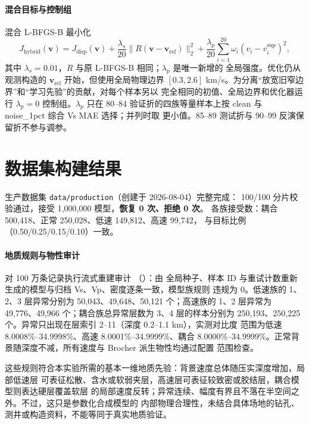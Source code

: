 \documentclass[UTF8,a4paper,11pt]{ctexart}
\begin{document}
\paragraph{混合目标与控制组}
混合 L-BFGS-B 最小化
\begin{equation}
J_{\mathrm{hybrid}}(\mathbf v)=J_{\mathrm{disp}}(\mathbf v)
+\frac{\lambda_s}{20}\|R(\mathbf v-\mathbf v_{\mathrm{ref}})\|_2^2
+\frac{\lambda_p}{20}\sum_{i=1}^{20}
\omega_i(v_i-v_i^{\mathrm{sup}})^2,
\end{equation}
其中 \(\lambda_s=0.01\)，\(R\) 与原 L-BFGS-B 相同；\(\lambda_p\) 是唯一新增的
全局强度。优化仍从观测构造的 \(\mathbf v_{\mathrm{ref}}\) 开始，但使用全局物理边界
\([0.3,2.6]\) km/s。为分离``放宽旧窄边界''和``学习先验''的贡献，对每个样本另以
完全相同的初值、全局边界和优化器运行 \(\lambda_p=0\) 控制组。\(\lambda_p\) 只在
80--84 验证折的四族等量样本上按 clean 与 noise\_1pct 综合 Vs MAE 选择；并列时取
更小值。85--89 测试折与 90--99 反演保留折不参与调参。

\section{数据集构建结果}\label{sec:data}
生产数据集 \texttt{data/production}（创建于 2026-08-04）完整完成：
100/100 分片校验通过，接受 1{,}000{,}000 模型，\textbf{恢复 0 次、拒绝 0 次}。
各族接受数：耦合 500{,}418、正常 250{,}028、低速 149{,}812、高速 99{,}742，
与目标比例（0.50/0.25/0.15/0.10）一致。

\paragraph{地质规则与物性审计}
对 100 万条记录执行流式重建审计
（）：由
全局种子、样本 ID 与重试计数重新生成的模型与归档 Vs、Vp、密度逐条一致，模型族规则
违规为 0。低速族的 1、2、3 层异常分别为 50{,}043、49{,}648、50{,}121 个；高速族的
1、2 层异常为 49{,}776、49{,}966 个；耦合族总异常层数为 3、4 层的样本分别为
250{,}193、250{,}225 个。异常只出现在层索引 2--11（深度 0.2--1.1 km），实测对比度
范围为低速 8.0008\%--34.9998\%、高速 8.0001\%--34.9999\%、耦合
8.0000\%--34.9999\%。正常背景随深度不减，所有速度与 Brocher 派生物性均通过配置
范围检查。

这些规则符合本实验所需的基本一维地质先验：背景速度总体随压实深度增加，局部低速层
可表征松散、含水或软弱夹层，高速层可表征较致密或胶结层，耦合模型则表达硬层覆盖软层
的局部速度反转；异常连续、幅度有界且不落在半空间之外。不过，这只是参数化合成模型的
内部物理合理性，未结合具体场地的钻孔、测井或构造资料，不能等同于真实地质验证。
\end{document}
